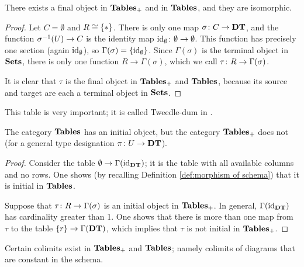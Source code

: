 \documentclass{amsart}
\def\DT{{\bf DT}}
\def\Tables{{\bf Tables}}
\begin{document}
\begin{lemma}\label{final object}

There exists a final object in $\Tables_+$ and in $\Tables$, and they are isomorphic.  

\end{lemma}

\begin{proof}

Let $C=\emptyset$ and $R\cong\{*\}$.  There is only one map $\sigma\taking C\to\DT$, and the function $\sigma^\m1(U)\to C$ is the identity map $\textnormal{id}_\emptyset\colon\emptyset\rightarrow\emptyset$.  This function has precisely one section (again $\textnormal{id}_\emptyset$), so $\Gamma(\sigma)=\{\textnormal{id}_\emptyset\}$.  Since $\Gamma(\sigma)$ is the terminal object in ${\bf Sets}$, there is only one function $R\to\Gamma(\sigma)$, which we call $\tau\colon R\rightarrow\Gamma(\sigma)$.

It is clear that $\tau$ is the final object in $\Tables_+$ and $\Tables$, because its source and target are each a terminal object in ${\bf Sets}$.

\end{proof}

This table is very important; it is called Tweedle-dum in \cite{Date}.

\begin{lemma}

The category $\Tables$ has an initial object, but the category $\Tables_+$ does not (for a general type designation $\pi\taking U\to\DT$).

\end{lemma}

\begin{proof}

Consider the table $\emptyset\to\Gamma(\id_\DT)$; it is the table with all available columns and no rows.  One shows (by recalling Definition \ref{def:morphism of schema}) that it is initial in $\Tables$.

Suppose that $\tau\colon R\rightarrow\Gamma(\sigma)$ is an initial object in $\Tables_+$.  In general, $\Gamma(\id_\DT)$ has cardinality greater than 1.  One shows that there is more than one map from $\tau$ to the table $\{r\}\to\Gamma(\DT)$, which implies that $\tau$ is not initial in $\Tables_+$.

\end{proof}

Certain colimits exist in $\Tables_+$ and $\Tables$; namely colimits of diagrams that are constant in the schema.
\end{document}
